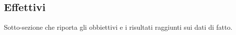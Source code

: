 \subsection{Effettivi}

Sotto-sezione che riporta gli obbiettivi e i risultati raggiunti sui dati di fatto.